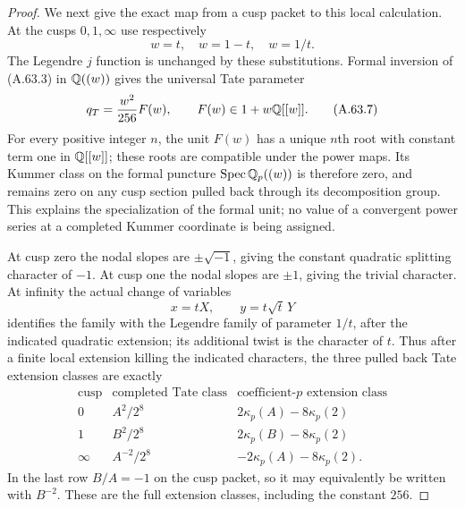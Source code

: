 \begin{proof}
We next give the exact map from a cusp packet to this local
calculation.  At the cusps $0,1,\infty$ use respectively
\[
                         w=t,\quad w=1-t,\quad w=1/t.
\tag{A.63.6}
\]
The Legendre $j$ function is unchanged by these substitutions.
Formal inversion of (A.63.3) in
$\mathbb Q((w))$ gives the universal Tate parameter
\[
                 q_T=\frac{w^2}{256}F(w),
                       \qquad F(w)\in1+w\mathbb Q[[w]].
\tag{A.63.7}
\]
For every positive integer $n$, the unit $F(w)$ has a unique
$n$th root with constant term one in $\mathbb Q[[w]]$; these roots
are compatible under the power maps.  Its Kummer class on the
formal puncture $\operatorname{Spec}\mathbb Q_p((w))$ is therefore
zero, and remains zero on any cusp section pulled back through
its decomposition group.  This explains the specialization
of the formal unit; no value of a convergent power series at a
completed Kummer coordinate is being assigned.

At cusp zero the nodal slopes are $\pm\sqrt{-1}$, giving
the constant quadratic splitting character of $-1$.
At cusp one the nodal slopes are $\pm1$, giving the trivial
character.  At infinity the actual change of variables
\[
                       x=tX,\qquad y=t\sqrt t\,Y
\tag{A.63.8}
\]
identifies the family with the Legendre family of parameter
$1/t$, after the indicated quadratic extension; its additional
twist is the character of $t$.  Thus after a finite local
extension killing the indicated characters, the three pulled
back Tate extension classes are exactly
\[
\begin{array}{c|c|c}
 \text{cusp}&\text{completed Tate class}&
                \text{coefficient-}p\text{ extension class}\\ \hline
 0&A^2/2^8&2\kappa_p(A)-8\kappa_p(2)\\
 1&B^2/2^8&2\kappa_p(B)-8\kappa_p(2)\\
 \infty&A^{-2}/2^8&-2\kappa_p(A)-8\kappa_p(2).
\end{array}
\tag{A.63.9}
\]
In the last row $B/A=-1$ on the cusp packet, so it may
equivalently be written with $B^{-2}$.
These are the full extension classes, including the constant
$256$.


\end{proof}
